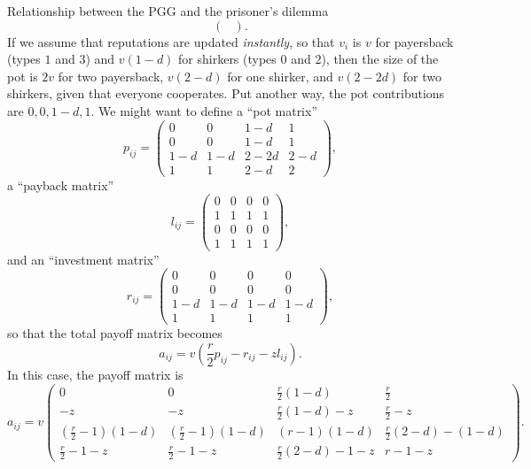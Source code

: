 \documentclass[13pt]{amsart}
\begin{document}
\begin{section}{Relationship between the PGG and the prisoner's dilemma}
\begin{equation}
\begin{pmatrix}
    \end{pmatrix}.
\end{equation}
If we assume that reputations are updated \emph{instantly}, so that $v_i$ is $v$ for payersback (types $1$ and $3$) and $v(1-d)$ for shirkers (types $0$ and $2$), then the size of the pot is $2v$ for two payersback, $v(2-d)$ for one shirker, and $v(2 - 2d)$ for two shirkers, given that everyone cooperates.
Put another way, the pot contributions are $0, 0, 1-d, 1$.
We might want to define a ``pot matrix''
\begin{equation}
    p_{ij} =
    \begin{pmatrix}
        0 & 0 & 1-d & 1 \\
        0 & 0 & 1-d & 1 \\
        1-d & 1-d & 2-2d & 2-d \\
        1 & 1 & 2-d & 2
    \end{pmatrix},
\end{equation}
a ``payback matrix''
\begin{equation}
    l_{ij} =
    \begin{pmatrix}
        0 & 0 & 0 & 0 \\
        1 & 1 & 1 & 1 \\
        0 & 0 & 0 & 0 \\
        1 & 1 & 1 & 1
    \end{pmatrix},
\end{equation}
and an ``investment matrix''
\begin{equation}
    r_{ij} =
    \begin{pmatrix}
        0 & 0 & 0 & 0 \\
        0 & 0 & 0 & 0 \\
        1-d & 1-d & 1-d & 1-d \\
        1 & 1 & 1 & 1
    \end{pmatrix},
\end{equation}
so that the total payoff matrix becomes
\begin{equation}
    a_{ij} = v(\frac{r}{2} p_{ij} - r_{ij} - zl_{ij}).
    \label{eq:long_version}
\end{equation}
In this case, the payoff matrix is
\begin{equation}
    a_{ij} = v
    \begin{pmatrix}
        0 & 0 & \frac{r}{2}(1-d) & \frac{r}{2} \\
        -z & -z & \frac{r}{2}(1-d) -z & \frac{r}{2} -z \\
        (\frac{r}{2} - 1)(1-d) & (\frac{r}{2} - 1)(1-d) & (r-1)(1-d)& \frac{r}{2}(2 - d) - (1-d)\\
        \frac{r}{2} - 1 - z & \frac{r}{2} - 1 -z & \frac{r}{2}(2 - d) - 1 - z & r - 1 -z
    \end{pmatrix}.
\end{equation}



\end{section}
\end{document}
